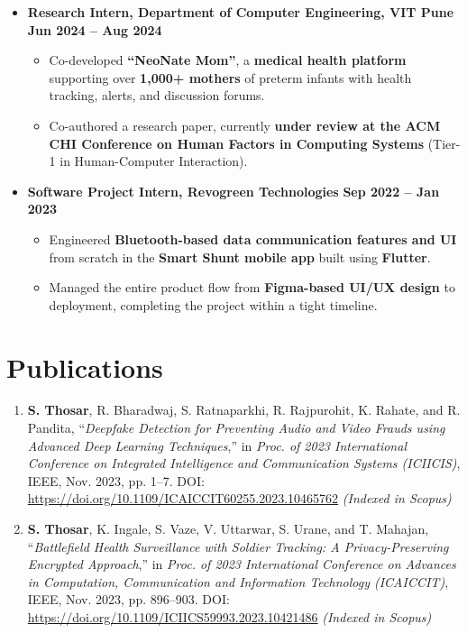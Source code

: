 \documentclass{article}
\begin{document}
\begin{itemize}
  \item \textbf{Research Intern, Department of Computer Engineering, VIT Pune} \hfill \textbf{Jun 2024 -- Aug 2024}
  \begin{itemize}
    \setlength\itemsep{0pt}
    \item Co-developed \textbf{“NeoNate Mom”}, a \textbf{medical health platform} supporting over \textbf{1,000+ mothers} of preterm infants with health tracking, alerts, and discussion forums.
    \item Co-authored a research paper, currently \textbf{under review at the ACM CHI Conference on Human Factors in Computing Systems} (Tier-1 in Human-Computer Interaction).
  \end{itemize}

  \item \textbf{Software Project Intern, Revogreen Technologies} \hfill \textbf{Sep 2022 -- Jan 2023}
  \begin{itemize}
    \setlength\itemsep{0pt}
    \item Engineered \textbf{Bluetooth-based data communication features and UI} from scratch in the \textbf{Smart Shunt mobile app} built using \textbf{Flutter}.
    \item Managed the entire product flow from \textbf{Figma-based UI/UX design} to deployment, completing the project within a tight timeline.
  \end{itemize}

\end{itemize}
\section{Publications}
\begin{enumerate}

    \item \textbf{S. Thosar}, R. Bharadwaj, S. Ratnaparkhi, R. Rajpurohit, K. Rahate, and R. Pandita,  
    “\textit{Deepfake Detection for Preventing Audio and Video Frauds using Advanced Deep Learning Techniques},”  
    in \textit{Proc. of 2023 International Conference on Integrated Intelligence and Communication Systems (ICIICIS)},  
    IEEE, Nov. 2023, pp. 1–7.  
    DOI: \url{https://doi.org/10.1109/ICAICCIT60255.2023.10465762}  
    \textit{(Indexed in Scopus)}

    \item \textbf{S. Thosar}, K. Ingale, S. Vaze, V. Uttarwar, S. Urane, and T. Mahajan,  
    “\textit{Battlefield Health Surveillance with Soldier Tracking: A Privacy-Preserving Encrypted Approach},”  
    in \textit{Proc. of 2023 International Conference on Advances in Computation, Communication and Information Technology (ICAICCIT)},  
    IEEE, Nov. 2023, pp. 896–903.  
    DOI: \url{https://doi.org/10.1109/ICIICS59993.2023.10421486}  
    \textit{(Indexed in Scopus)}

\end{enumerate}
\end{document}
